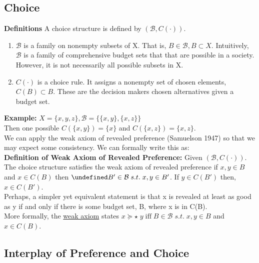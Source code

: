 \documentclass[12pt]{article}
\let\oldforall\forall
\let\forall\undefined
\DeclareMathOperator{\forall}{\,\oldforall\,}
\begin{document}
\subsection{Choice}
\textbf{Definitions}
A choice structure is defined by $(\mathcal{B}, C(\cdot))$.
\begin{enumerate}
\item $\mathcal{B}$ is a family on nonempty subsets of X. That is, $B \in \mathcal{B}, B \subset X$. Intuitively, $\mathcal{B}$ is a family of comprehensive budget sets that that are possible in a society. However, it is not necessarily all possible subsets in X.
\item $C(\cdot)$ is a choice rule. It assigns a nonempty set of chosen elements, $C(B) \subset B$. These are the decision makers chosen alternatives given a budget set.
\end{enumerate}
\textbf{Example:}
$X = \{x,y,z\}, \mathcal{B} = \{\{x,y\}, \{x,z\}\}$ 
\\Then one possible $C(\{x,y\}) = \{x\}$ and $C(\{x,z\}) = \{x, z\}$. 
\\We can apply the weak axiom of revealed preference (Samuelson 1947) so that we may expect some consistency. We can formally write this as:
\\\textbf{Definition of Weak Axiom of Revealed Preference:} Given $(\mathcal{B}, C(\cdot))$. The choice structure satisfies the weak axiom of revealed preference if $x,y \in B$ and $x \in C(B)$ then $\forall B' \in \mathcal{B} \; s.t. \; x,y \in B'$. If $y \in C(B')$ then, $x\in C(B')$.
\\ Perhaps, a simpler yet equivalent statement is that x is revealed at least as good as y if and only if there is some budget set, B, where x is in C(B).
\\ More formally, the \underline{weak axiom} states $x \succeq\star \; y \; \text{iff} \; B \in \mathcal{B} \; s.t. \; x,y \in B$ and $x \in C(B)$.
\subsection{Interplay of Preference and Choice}
\end{document}
